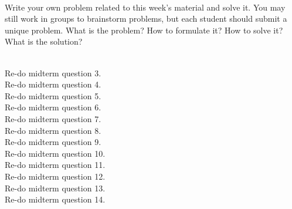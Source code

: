 \documentclass[]{article}
\newif\ifmotivation
\begin{document}
\begin{qunlist}
%
%
%  
%






 \\
Write your own problem related to this week's material and solve it. You may still work in groups to brainstorm problems, but each student should submit a unique problem. What is the problem? How to formulate it? How to solve it? What is the solution?

 \\
Re-do midterm question 3.
 \\
Re-do midterm question 4.
 \\
Re-do midterm question 5.
 \\
Re-do midterm question 6.
 \\
Re-do midterm question 7.
 \\
Re-do midterm question 8.
 \\
Re-do midterm question 9.
 \\
Re-do midterm question 10.
 \\
Re-do midterm question 11.
 \\
Re-do midterm question 12.
 \\
Re-do midterm question 13.
 \\
Re-do midterm question 14.
  
  
    
\end{qunlist}
\end{document}
